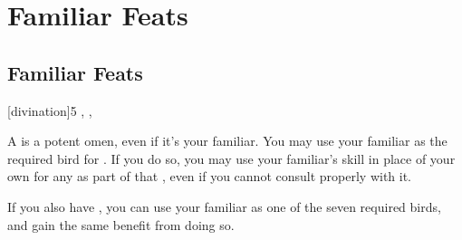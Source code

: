 \chapter{Familiar Feats}

\section{Familiar Feats}


[divination]{5}{
	,
	,
}{
	A  is a potent omen, even if it's your familiar.
	You may use your familiar as the required bird for .
	If you do so, you may use your familiar's  skill in place of your own for any {\tests} as part of that , even if you cannot consult properly with it.
	
	If you also have , you can use your familiar as one of the seven required birds, and gain the same benefit from doing so.
}
